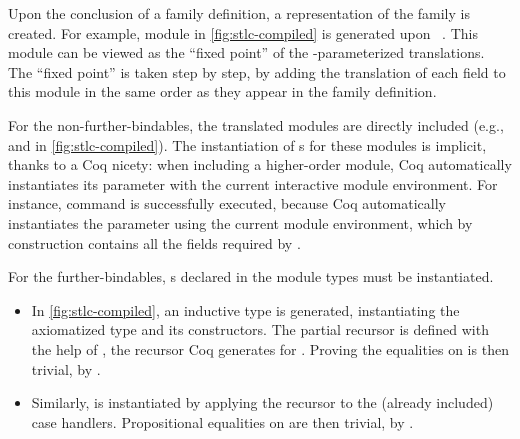 
Upon the conclusion of a family definition,
a representation of the family is created.
For example, module  in \cref{fig:stlc-compiled} is generated
upon ~.
%
This module can be viewed as the ``fixed point'' of the
-parameterized translations.
The ``fixed point'' is taken step by step, by adding the translation of
each field to this module in the same order as they appear in the family
definition.

For the non-further-bindables, the translated modules are directly included
(e.g.,  and  in \cref{fig:stlc-compiled}).
%
The instantiation of s for these modules is implicit, thanks to a Coq nicety:
when including a higher-order module, Coq automatically instantiates its
parameter with the current interactive module environment.
For instance, command  is successfully executed,
because Coq automatically instantiates the  parameter using the current
module environment, which by construction contains all the fields required by .

For the further-bindables, s declared in the module types must be instantiated.
%
\begin{itemize}
  [align=left,itemsep=2pt,labelsep=*,leftmargin=*]

\item
In \cref{fig:stlc-compiled},
an inductive type  is generated, instantiating the axiomatized
 type and its constructors.
%
The partial recursor  is defined
with the help of , the recursor Coq generates for .
Proving the equalities on  is then trivial, by .

\item
Similarly,  is instantiated by applying the recursor 
to the (already included) case handlers. %
Propositional equalities on  are then trivial, by .

\end{itemize}

